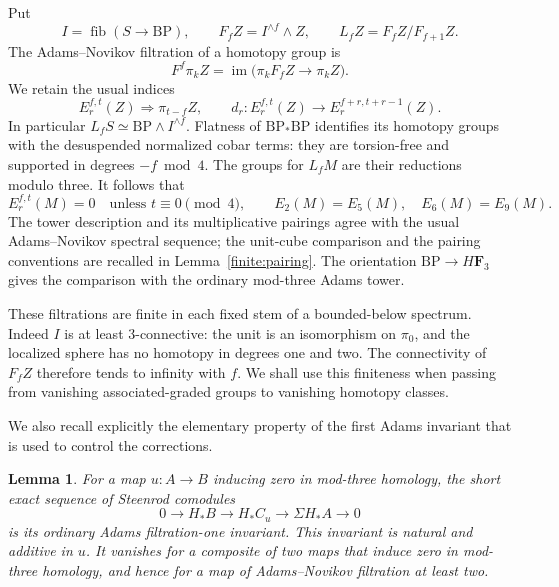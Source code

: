 \documentclass[11pt]{article}
\newtheorem{lemma}[theorem]{Lemma}
\theoremstyle{definition}
\theoremstyle{remark}
\numberwithin{equation}{section}
\begin{document}
Put
\[
 I=\operatorname{fib}(S\longrightarrow\mathrm{BP}),\qquad
 F_fZ=I^{\wedge f}\wedge Z,\qquad
 L_fZ=F_fZ/F_{f+1}Z.
\]
The Adams--Novikov filtration of a homotopy group is
\[
 F^f\pi_kZ=\operatorname{im}\bigl(\pi_kF_fZ\longrightarrow\pi_kZ\bigr).
\]
We retain the usual indices
\[
 E_r^{f,t}(Z)\Longrightarrow\pi_{t-f}Z,\qquad
 d_r:E_r^{f,t}(Z)\longrightarrow E_r^{f+r,t+r-1}(Z).
\]
In particular \(L_fS\simeq\mathrm{BP}\wedge I^{\wedge f}\).  Flatness of
\(\mathrm{BP}_*\mathrm{BP}\) identifies its homotopy groups with the desuspended
normalized cobar terms: they are torsion-free and supported in degrees
\(-f\bmod4\).  The groups for \(L_fM\) are their reductions modulo three.
It follows that
\begin{equation}\label{cube:sparseness}
 E_r^{f,t}(M)=0\quad\text{unless }t\equiv0\pmod4,
 \qquad E_2(M)=E_5(M),\quad E_6(M)=E_9(M).
\end{equation}
The tower description and its multiplicative pairings agree with the
usual Adams--Novikov spectral sequence; the unit-cube comparison and
the pairing conventions are recalled in Lemma~\ref{finite:pairing}.
The orientation \(\mathrm{BP}\to H\mathbf F_3\) gives the comparison with the ordinary
mod-three Adams tower.

These filtrations are finite in each fixed stem of a bounded-below
spectrum.  Indeed \(I\) is at least 3-connective: the unit is an
isomorphism on \(\pi_0\), and the localized sphere has no homotopy in
degrees one and two.  The connectivity of \(F_fZ\) therefore tends to
infinity with \(f\).  We shall use this finiteness when passing from
vanishing associated-graded groups to vanishing homotopy classes.

We also recall explicitly the elementary property of the first Adams
invariant that is used to control the corrections.

\begin{lemma}\label{cube:primary-invariant}
For a map \(u:A\to B\) inducing zero in mod-three homology, the short
exact sequence of Steenrod comodules
\[
 0\longrightarrow H_*B\longrightarrow H_*C_u
   \longrightarrow \Sigma H_*A\longrightarrow0
\]
is its ordinary Adams filtration-one invariant.  This invariant is
natural and additive in \(u\).  It vanishes for a composite of two maps
that induce zero in mod-three homology, and hence for a map of
Adams--Novikov filtration at least two.
\end{lemma}
\end{document}
